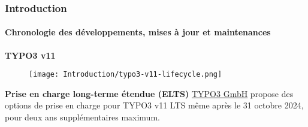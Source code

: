 %

\begin{frame}[fragile]
	\frametitle{Introduction}
	\framesubtitle{Chronologie des développements, mises à jour et maintenances}

	\textbf{TYPO3 v11}

	\begin{figure}
		\texttt{[image: Introduction/typo3-v11-lifecycle.png]}
	\end{figure}

	\textbf{Prise en charge long-terme étendue (ELTS)}\newline
	\smaller
		\href{https://typo3.com}{TYPO3 GmbH} propose des options de prise en charge
		pour TYPO3 v11 LTS même après le 31 octobre 2024, pour deux ans supplémentaires
		maximum.
	\normalsize

\end{frame}

